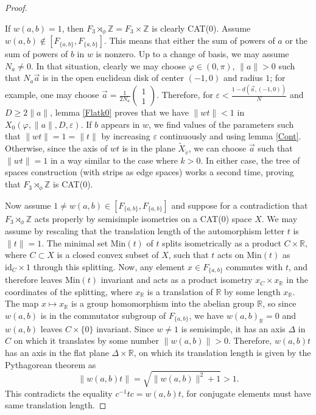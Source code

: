 \documentclass  [a4paper, 11pts] {article}
\newcommand{\R}{\mathbb{R}}
\newcommand{\Z}{\mathbb{Z}}
\newcommand{\eps}{\varepsilon}
\newcommand{\Min}{{\mathrm{Min}}}
\begin{document}
\begin{proof} ~

If $w(a, b)=1$, then $F_3\rtimes_\phi\Z = F_3\times \Z$ is clearly CAT(0). Assume $w(a, b)\notin [F_{\{a, b\}}, F_{\{a, b\}}]$. This means that either the sum of powers of $a$ or the sum of powers of $b$ in $w$ is nonzero. Up to a change of basis, we may assume $N_a \ne 0$. In that situation, clearly we may choose $\varphi\in (0, \pi)$, $\|a\| > 0$ such that $N_a\vec{a}$ is in the open euclidean disk of center $(-1, 0)$ and radius $1$; for example, one may choose $\vec{a} = \frac{1}{2N_a}\begin{pmatrix} 1 \\ 1 \end{pmatrix}$. Therefore, for $\eps < \frac{1-d(\vec{a}, (-1, 0))}{N}$ and $D\ge 2\|a\|$, lemma \ref{Flatk0} proves that we have $\|wt\| < 1$ in $X_0(\varphi, \|a\|, D, \eps)$. If $b$ appears in $w$, we find values of the parameters such that $\|wt\| = 1 = \|t\|$ by increasing $\eps$ continuously and using lemma \ref{Cont}. Otherwise, since the axis of $wt$ is in the plane $\tilde{X}_{\tilde{v}}$, we can choose $\vec{a}$ such that $\|wt\|=1$ in a way similar to the case where $k > 0$. In either case, the tree of spaces construction (with strips as edge spaces) works a second time, proving that $F_3\rtimes_\phi\Z$ is CAT(0).

Now assume $1\ne w(a, b)\in [F_{\{a, b\}}, F_{\{a, b\}}]$ and suppose for a contradiction that $F_3\rtimes_\phi\Z$ acts properly by semisimple isometries on a CAT(0) space $X$. We may assume by rescaling that the translation length of the automorphism letter $t$ is $\|t\|=1$. The minimal set $\Min(t)$ of $t$ splits isometrically as a product $C\times \R$, where $C\subset X$ is a closed convex subset of $X$, such that $t$ acts on $\Min(t)$ as $\mathrm{id}_C\times 1$ through this splitting. Now, any element $x\in F_{\{a, b\}}$ commutes with $t$, and therefore leaves $\Min(t)$ invariant and acts as a product isometry $x_C\times x_\R$ in the coordinates of the splitting, where $x_\R$ is a translation of $\R$ by some length $x_\R$. The map $x\mapsto x_\R$ is a group homomorphism into the abelian group $\R$, so since $w(a, b)$ is in the commutator subgroup of $F_{\{a, b\}}$, we have $w(a,b)_\R = 0$ and $w(a,b)$ leaves $C\times\{0\}$ invariant. Since $w\ne 1$ is semisimple, it has an axis $\Delta$ in $C$ on which it translates by some number $\|w(a,b)\| > 0$. Therefore, $w(a, b)t$ has an axis in the flat plane $\Delta\times \R$, on which its translation length is given by the Pythagorean theorem as
\[\|w(a, b)t\| = \sqrt{\|w(a, b)\|^2 + 1} > 1.\]
This contradicts the equality $c^{-1}tc = w(a, b)t$, for conjugate elements must have same translation length.

\end{proof}
\end{document}

